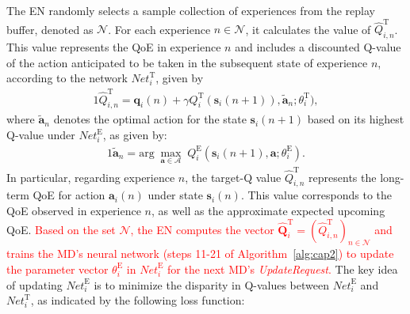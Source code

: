 \documentclass[10pt, journal,letterpaper]{IEEEtran}
\begin{document}
The EN randomly selects a sample collection of experiences from the replay buffer, denoted as $\mathcal{N}$. For each experience $n \in \mathcal{N}$, it calculates the value of $	\hat{Q}^{\text{T}}_{i,n}$. This value represents the QoE in experience $n$ and includes a discounted Q-value of the action anticipated to be taken in the subsequent state of experience $n$, according to the network $\textit{Net}^\text{T}_i$, given by
\begin{alignat}{1}
	\hat{Q}_{i,n}^{\text{T}} = \boldsymbol{q}_i(n) + \gamma Q_i^{\text{T}}(\boldsymbol{s}_i(n+1)), \tilde{\boldsymbol{a}}_n; \theta_i^{\text{T}}),
	\label{29}  
\end{alignat}  
where $\tilde{\boldsymbol{a}}_n$ denotes the optimal action for the state $\boldsymbol{s}_i(n+1)$ based on its highest Q-value under $\textit{Net}_i^{\text{E}}$, as given by:
\begin{alignat}{1}
	\tilde{\boldsymbol{a}}_n = \text{arg} \; \max_{\boldsymbol{a} \in \mathcal{A}} \; Q_i^{\text{E}}(\boldsymbol{s}_i(n+1), \boldsymbol{a}; \theta_i^{\text{E}}).
	\label{30}  
\end{alignat} 
In particular, regarding experience $n$, the target-Q value $\hat{Q}_{i,n}^{\text{T}}$ represents the long-term QoE for action $\boldsymbol{a}_i(n)$ under state $\boldsymbol{s}_i(n)$. This value corresponds to the QoE observed in experience $n$, as well as the approximate expected upcoming QoE. %
\textcolor{red}{Based on the set $\mathcal{N}$, the EN computes the vector $\hat{\mathbf{Q}}_i^{\text{T}} = (\hat{Q}^{\text{T}}_{i,n})_{n \in \mathcal{N}}$ and trains the MD's neural network (steps 11-21 of Algorithm~\ref{alg:cap2}) to update the parameter vector $\theta^{\text{E}}_i$ in $\textit{Net}_i^{\text{E}}$ for the next MD's \textit{UpdateRequest}.} The key idea of updating $\textit{Net}_i^{\text{E}}$ is to minimize the disparity in Q-values between $\textit{Net}_i^{\text{E}}$ and $\textit{Net}_i^{\text{T}}$, as indicated by the following loss function:
	
\end{document}
